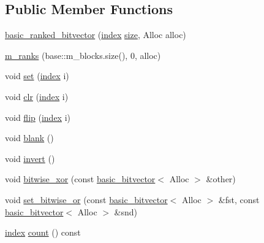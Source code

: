 \subsection*{Public Member Functions}
\begin{DoxyCompactItemize}
\item 
\hyperlink{classterraces_1_1basic__ranked__bitvector_a5c6565730dd4f847b9538ea2cb29bdce}{basic\+\_\+ranked\+\_\+bitvector} (\hyperlink{namespaceterraces_adbc33ccb543d1634e96d0eb02e472c77}{index} \hyperlink{classterraces_1_1basic__bitvector_a7a846347ea4c1c1f542ff3331307fdb9}{size}, Alloc alloc)
\item 
\hyperlink{classterraces_1_1basic__ranked__bitvector_ae29465a05501bcc83ce6f03df7d860ae}{m\+\_\+ranks} (base\+::m\+\_\+blocks.\+size(), 0, alloc)
\item 
void \hyperlink{classterraces_1_1basic__ranked__bitvector_ad586efd4696b4d1b9c6a2d01afd7f6e8}{set} (\hyperlink{namespaceterraces_adbc33ccb543d1634e96d0eb02e472c77}{index} i)
\item 
void \hyperlink{classterraces_1_1basic__ranked__bitvector_ab473239260d7a43c5c000f258e69b35f}{clr} (\hyperlink{namespaceterraces_adbc33ccb543d1634e96d0eb02e472c77}{index} i)
\item 
void \hyperlink{classterraces_1_1basic__ranked__bitvector_a4e5caea75842be5a7a598f40e3ae452d}{flip} (\hyperlink{namespaceterraces_adbc33ccb543d1634e96d0eb02e472c77}{index} i)
\item 
void \hyperlink{classterraces_1_1basic__ranked__bitvector_a800cac4946ede86d99fd361e8dabbf02}{blank} ()
\item 
void \hyperlink{classterraces_1_1basic__ranked__bitvector_a1577fa0a6830398e813ea7e6ac3f8587}{invert} ()
\item 
void \hyperlink{classterraces_1_1basic__ranked__bitvector_af574d03b47d01094a2b93569e7dda53e}{bitwise\+\_\+xor} (const \hyperlink{classterraces_1_1basic__bitvector}{basic\+\_\+bitvector}$<$ Alloc $>$ \&other)
\item 
void \hyperlink{classterraces_1_1basic__ranked__bitvector_addd524d9185ed8415909b1bba88102ea}{set\+\_\+bitwise\+\_\+or} (const \hyperlink{classterraces_1_1basic__bitvector}{basic\+\_\+bitvector}$<$ Alloc $>$ \&fst, const \hyperlink{classterraces_1_1basic__bitvector}{basic\+\_\+bitvector}$<$ Alloc $>$ \&snd)
\item 
\hyperlink{namespaceterraces_adbc33ccb543d1634e96d0eb02e472c77}{index} \hyperlink{classterraces_1_1basic__ranked__bitvector_a1d7f3da0a64ed420e4836994cd8cba3c}{count} () const
\item 

\end{DoxyCompactItemize}
